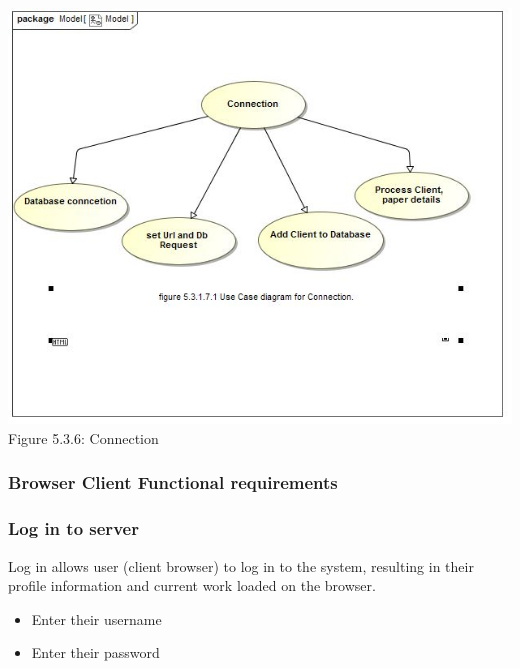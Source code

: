 \documentclass[hidelinks,a4paper,12pt]{article}
\begin{document}
	\includegraphics[width=1\textwidth]{./Graphs/UseCaseforConnection.jpg}\\[0.4cm]
	
		Figure 5.3.6: Connection
		

	\subsubsection{Browser Client Functional requirements}
		
		\subsubsection{Log in to server}
		
		Log in allows user (client browser) to log in to the system, resulting 
		in their profile information and current work loaded on the browser.  
		
		\begin{itemize}
			\item Enter their username
			\item Enter their password
		\end{itemize}
		
\end{document}
